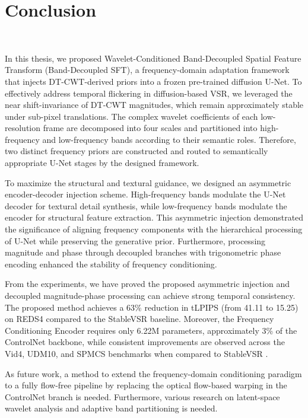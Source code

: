 \chapter{Conclusion}{~}{~}
\label{CH:CONC}

 In this thesis, we proposed Wavelet-Conditioned Band-Decoupled Spatial Feature Transform (Band-Decoupled SFT), a frequency-domain adaptation framework that injects DT-CWT-derived priors into a frozen pre-trained diffusion U-Net. To effectively address temporal flickering in diffusion-based VSR, we leveraged the near shift-invariance of DT-CWT magnitudes, which remain approximately stable under sub-pixel translations. The complex wavelet coefficients of each low-resolution frame are decomposed into four scales and partitioned into high-frequency and low-frequency bands according to their semantic roles. Therefore, two distinct frequency priors are constructed and routed to semantically appropriate U-Net stages by the designed framework.
 
 To maximize the structural and textural guidance, we designed an asymmetric encoder-decoder injection scheme. High-frequency bands modulate the U-Net decoder for textural detail synthesis, while low-frequency bands modulate the encoder for structural feature extraction. This asymmetric injection demonstrated the significance of aligning frequency components with the hierarchical processing of U-Net while preserving the generative prior. Furthermore, processing magnitude and phase through decoupled branches with trigonometric phase encoding enhanced the stability of frequency conditioning.
 

 
From the experiments, we have proved the proposed asymmetric injection and decoupled magnitude-phase processing can achieve strong temporal consistency. The proposed method achieves a 63\% reduction in tLPIPS (from 41.11 to 15.25) on REDS4 compared to the StableVSR baseline. Moreover, the Frequency Conditioning Encoder requires only 6.22M parameters, approximately 3\% of the ControlNet backbone, while consistent improvements are observed across the Vid4, UDM10, and SPMCS benchmarks when compared to StableVSR \cite{rota2024stablevsr}. 

As future work, a method to extend the frequency-domain conditioning paradigm to a fully flow-free pipeline by replacing the optical flow-based warping in the ControlNet branch is needed. Furthermore, various research on latent-space wavelet analysis and adaptive band partitioning is needed.


    
